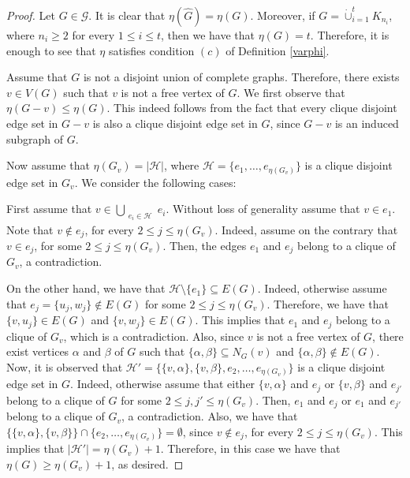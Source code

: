\documentclass[12pt]{amsart}
\begin{document}
\begin{proof}
Let $G\in \mathcal{G}$. It is clear that $\eta(\widehat{G})=\eta(G)$. Moreover, if $G=\dot{\cup}_{i=1}^{t}K_{n_i}$, where $n_i\geq 2$ for every $1\leq i\leq t$, then we have that $\eta(G)=t$. Therefore, it is enough to see that $\eta$ satisfies condition $(c)$ of Definition \ref{varphi}.
\par Assume that $G$ is not a disjoint union of complete graphs. Therefore, there exists $v\in V(G)$ such that $v$ is not a free vertex of $G$. We first observe that $\eta(G-v)\leq \eta(G)$. This indeed follows from the fact that every clique disjoint edge set in $G-v$ is also a clique disjoint edge set in $G$, since $G-v$ is an induced subgraph of $G$.
\par Now assume that $\eta(G_v)=|\mathcal{H}|$, where $\mathcal{H}=\{e_1,\ldots,e_{\eta(G_v)}\}$ is a clique disjoint edge set in $G_v$. We consider the following cases:
\par First assume that $v\in \bigcup \limits_{\substack{e_i \in \mathcal{H}}}e_i$. Without loss of generality assume that $v\in e_1$. Note that $v\notin e_j$, for every $2\leq j \leq \eta(G_v)$. Indeed, assume on the contrary that $v\in e_j$, for some $2\leq j \leq \eta(G_v)$. Then, the edges $e_1$ and $e_j$ belong to a clique of $G_v$, a contradiction.
\par On the other hand, we have that $\mathcal{H}\setminus \{e_1\}\subseteq E(G)$. Indeed, otherwise assume that $e_j=\{u_j,w_j\}\notin E(G)$ for some  $2\leq j \leq \eta(G_v)$. Therefore, we have that $\{v,u_j\}\in E(G)$ and $\{v,w_j\}\in E(G)$. This implies that $e_1$ and $e_j$ belong to a clique of $G_v$, which is a contradiction. Also, since $v$ is not a free vertex of $G$, there exist vertices $\alpha$ and $\beta$ of $G$ such that $\{\alpha,\beta\}\subseteq N_G(v)$ and $\{\alpha,\beta\}\notin E(G)$. Now, it is observed that $\mathcal{H'}=\{\{v,\alpha\},\{v,\beta\},e_2,\ldots,e_{\eta(G_v)}\}$ is a clique disjoint edge set in $G$. Indeed, otherwise assume that either $\{v,\alpha\}$ and $e_j$ or $\{v,\beta\}$ and $e_{j'}$ belong to a clique of $G$ for some $2\leq j,j'\leq \eta(G_v)$. Then, $e_1$ and $e_j$ or $e_1$ and $e_{j'}$ belong to a clique of $G_v$, a contradiction. Also, we have that $\{\{v,\alpha\},\{v,\beta\}\}\cap \{e_2,\ldots,e_{\eta(G_v)}\}=\emptyset$, since $v\notin e_j$, for every $2\leq j \leq \eta(G_v)$. This implies that $|\mathcal{H'}|=\eta(G_v)+1$. Therefore, in this case we have that $\eta(G)\geq \eta(G_v)+1$, as desired.

\end{proof}
\end{document}
